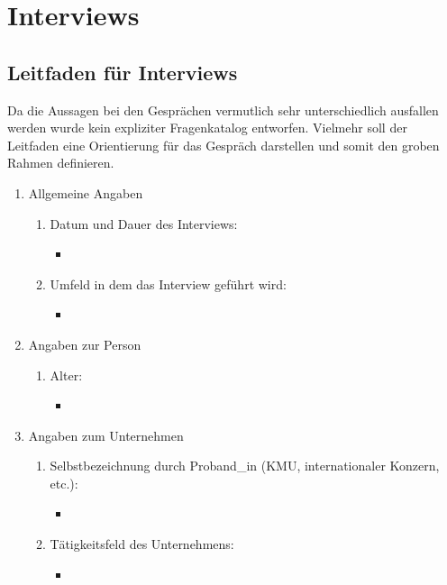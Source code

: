 \documentclass[Bachelorarbeit.tex]{subfiles}
\begin{document}
\chapter{Interviews}

\newpage
\section{Leitfaden für Interviews}
\label{anhang:leitfaden_interviews}
Da die Aussagen bei den Gesprächen vermutlich sehr unterschiedlich ausfallen werden wurde kein expliziter Fragenkatalog entworfen. Vielmehr soll der Leitfaden eine Orientierung für das Gespräch darstellen und somit den groben Rahmen definieren.

\begin{enumerate}
	\item Allgemeine Angaben
	\begin{enumerate}
		\item Datum und Dauer des Interviews:
		\begin{itemize}
			\item[] 
		\end{itemize}
		\item Umfeld in dem das Interview geführt wird:
		\begin{itemize}
			\item[]
		\end{itemize}
	\end{enumerate}
	\item Angaben zur Person
	\begin{enumerate}
		\item Alter:
		\begin{itemize}
			\item[] 
		\end{itemize}
	\end{enumerate}
	\item Angaben zum Unternehmen
	\begin{enumerate}
		\item Selbstbezeichnung durch Proband\_in  (\ac{KMU}, internationaler Konzern, etc.):
		\begin{itemize}
			\item[] 
		\end{itemize}
		\item Tätigkeitsfeld des Unternehmens:
		\begin{itemize}
			\item[] 
		\end{itemize}
	\end{enumerate}

\end{enumerate}
\end{document}
